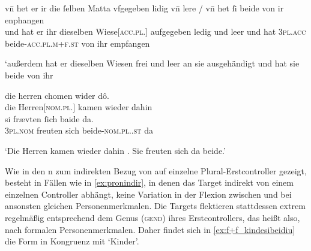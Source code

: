 \begin{exe}
\ex \label{ex:pronindir}
	\begin{xlist}
	\ex \label{ex:pronindir_1}
		\gll vn̄ het er ir {die ſelben} Matta vfgegeben lidig vn̄ lere /
			vn̄ het ſi beide von ir enphangen \\
			und hat er ihr dieselben Wiese[\textsc{acc.pl.\FemI}] aufgegeben ledig und
			leer {} und hat \textsc{3pl\subI.acc} beide-\textsc{acc.pl.m+f\subI.st} von
			ihr empfangen \\
		\begin{taggedline}{\parencites(Freiburg i.\,Br., 1297)[\pno~2733, 105.23--24]{cao4}}
		\trans `außerdem hat er dieselben Wiesen frei und leer an sie
			ausgehändigt und hat sie beide von ihr 
		\end{taggedline}

	\ex \label{ex:pronindir_2}
		\gll die herren chomen wider dô. \\
			die Herren[\textsc{nom.pl.\MascM}] kamen wieder dahin \\
		\textelp{}
	\sn \gll si frævten ſich baide da. \\
			\textsc{3pl\subM.nom} freuten sich beide-\textsc{nom.pl.\MascM.st} da \\
		\begin{taggedline}{\parencites[\pno~11\rb, 7--10]{kc:C1}[vgl.][\pno~11\vb, 12--15]{kc:K}[2055--2058]{schroeder1895}}
		\trans `Die Herren kamen wieder dahin \textelp{}. Sie freuten sich da
			beide.'
		\end{taggedline}
	\end{xlist}
\end{exe}

Wie in den n
 zum indirekten
Bezug von  auf einzelne Plural-Erstcontroller gezeigt, besteht in
Fällen wie in \cref{ex:pronindir}, in denen das Target indirekt von einem
einzelnen Controller abhängt, keine Variation in der Flexion zwischen
 und  bei ansonsten gleichen Personenmerkmalen. Die
Targets flektieren stattdessen extrem regelmäßig entsprechend dem Genus (\textsc{gend})
ihres Erstcontrollers, das heißt also, nach formalen Personenmerkmalen. Daher
findet sich in \cref{ex:f+f_kindesibeidiu} die Form  in Kongruenz
mit  `Kinder'.

